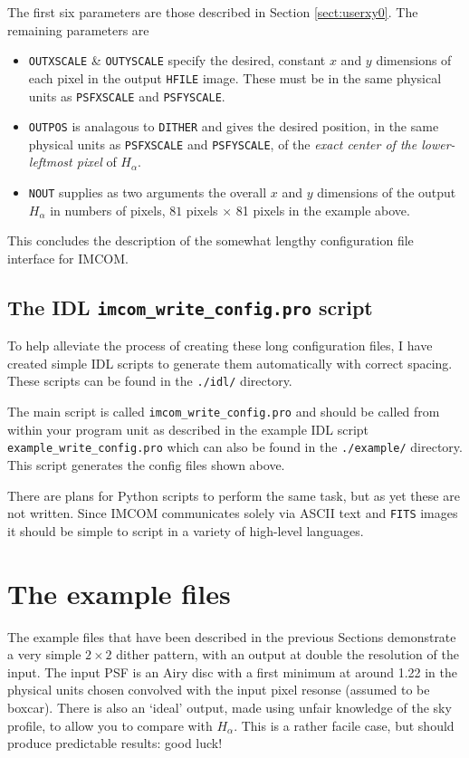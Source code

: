 \documentclass[10pt]{article}
\begin{document}
The first six parameters are those described in Section \ref{sect:userxy0}. The remaining parameters are
\begin{itemize}
\item \texttt{OUTXSCALE} \& \texttt{OUTYSCALE} specify the desired, constant $x$ and $y$ dimensions of each pixel in the output \texttt{HFILE} image. These must be in the same physical units as \texttt{PSFXSCALE} and \texttt{PSFYSCALE}.
\item \texttt{OUTPOS} is analagous to \texttt{DITHER} and gives the desired position, in the same physical units as \texttt{PSFXSCALE} and \texttt{PSFYSCALE}, of the \emph{exact center of the lower-leftmost pixel} of $H_{\alpha}$.
\item \texttt{NOUT} supplies as two arguments the overall $x$ and $y$ dimensions of the output $H_{\alpha}$ in numbers of pixels, $81$ pixels $\times$ 81 pixels in the example above.
\end{itemize}

This concludes the description of the somewhat lengthy configuration file interface for IMCOM.  

\subsection{The IDL \texttt{imcom\_write\_config.pro} script}\label{sect:idl}
To help alleviate the process of creating these long configuration files, I have created simple IDL scripts to generate them automatically with correct spacing.  These scripts can be found in the \texttt{./idl/} directory. 

The main script is called \texttt{imcom\_write\_config.pro} and should be called from within your program unit as described in the example IDL script \texttt{example\_write\_config.pro} which can also be found in the \texttt{./example/} directory.  This script generates the config files shown above.

There are plans for Python scripts to perform the same task, but as yet these are not written.  Since IMCOM communicates solely via ASCII text and \texttt{FITS} images it should be simple to script in a variety of high-level languages.

\section{The example files}
The example files that have been described in the previous Sections demonstrate a very simple $2 \times 2$ dither pattern, with an output at double the resolution of the input.  The input PSF is an Airy disc with a first minimum at around 1.22 in the physical units chosen convolved with the input pixel resonse (assumed to be boxcar).  There is also an `ideal' output, made using unfair knowledge of the sky profile, to allow you to compare with $H_{\alpha}$.  This is a rather facile case, but should produce predictable results: good luck!
\end{document}
